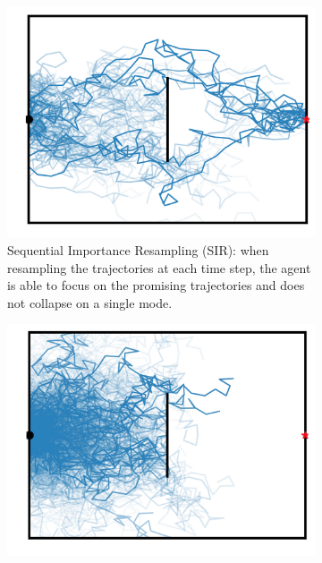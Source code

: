 \begin{figure}
\begin{subfigure}{.295\textwidth}
\centering
\includegraphics[width=\linewidth, trim={1.1cm 0cm .5cm 0cm},clip]{articles/smcp/figures/smc_resampling_true.png}
\caption{Sequential Importance Resampling (SIR): when resampling the trajectories at each time step, the agent is able to focus on the promising trajectories and does not collapse on a single mode.}
\label{fig:toy_sir}
\end{subfigure}\hspace{0.05\linewidth}
\begin{subfigure}{.295\textwidth}
\centering
\includegraphics[width=\linewidth, trim={1.1cm 0cm .5cm 0cm},clip]{articles/smcp/figures/smc_resampling_false.png}

\end{subfigure}
\end{figure}
